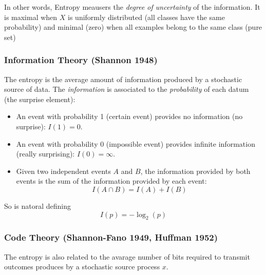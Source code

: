 In other words, Entropy meausers the \textit{degree of uncertainty} of the information. It is maximal when $X$ is uniformly distributed (all classes have the same probability) and minimal (zero) when all examples belong to the same class (pure set)
\begin{center}
\end{center}

\subsubsection{Information Theory (Shannon 1948)}
The entropy is the average amount of information produced by a stochastic source of data. The \textit{information} is associated to the \textit{probability} of each datum (the surprise element):
\begin{itemize}
    \item An event with probability 1 (certain event) provides no information (no surprise): \(I(1)=0\).
    \item An event with probability 0 (impossible event) provides infinite information (really surprising): \(I(0)=\infty\).
    \item Given two independent events \(A\) and \(B\), the information provided by both events is the sum of the information provided by each event:
    \[
        I(A \cap B) = I(A) + I(B)
    \]
\end{itemize}
So is natoral defining 
\[
    I(p) = -\log_2(p)
\]
\subsubsection{Code Theory (Shannon-Fano 1949, Huffman 1952)}
The entropy is also related to the avarage number of bits required to transmit outcomes produces by a stochastic source process $x$.

